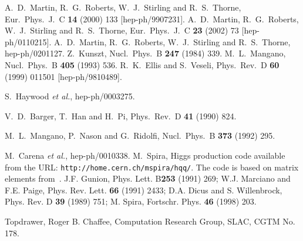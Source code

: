 \documentclass[paper]{JHEP3}
\begin{document}
\begin{thebibliography}{99}
A.~D.~Martin, R.~G.~Roberts, W.~J.~Stirling and R.~S.~Thorne,
Eur.\ Phys.\ J.\ C {\bf 14} (2000) 133
[hep-ph/9907231].
A.~D.~Martin, R.~G.~Roberts, W.~J.~Stirling and R.~S.~Thorne,
Eur.\ Phys.\ J.\ C {\bf 23} (2002) 73
[hep-ph/0110215].
A.~D.~Martin, R.~G.~Roberts, W.~J.~Stirling and R.~S.~Thorne,
hep-ph/0201127.
Z.~Kunszt,
Nucl.\ Phys.\ B {\bf 247} (1984) 339.
M.~L.~Mangano,
Nucl.\ Phys.\ B {\bf 405} (1993) 536.
R.~K.~Ellis and S.~Veseli,
Phys.\ Rev.\ D {\bf 60} (1999) 011501
[hep-ph/9810489].

S.~Haywood {\it et al.},
hep-ph/0003275.

V.~D.~Barger, T.~Han and H.~Pi,
Phys.\ Rev.\ D {\bf 41} (1990) 824.

M.~L.~Mangano, P.~Nason and G.~Ridolfi,
Nucl.\ Phys.\ B {\bf 373} (1992) 295.

M.~Carena {\it et al.},
hep-ph/0010338.
M.~Spira, Higgs production code available from the URL: \newline
{\tt http://home.cern.ch/mspira/hqq/}. The 
code is based on matrix elements from~\cite{Kunszt:1984ri,gunion}.
J.F. Gunion, Phys. Lett. B{\bf 253} (1991) 269;
W.J. Marciano and F.E. Paige, Phys. Rev. Lett. {\bf 66} (1991) 2433;
D.A. Dicus and S. Willenbrock, Phys. Rev. D {\bf39} (1989) 751;
M. Spira, Fortschr. Phys. {\bf 46} (1998) 203.

    Topdrawer, Roger B. Chaffee, Computation Research Group, SLAC, 
   CGTM No.  178. 
\end{thebibliography}
\end{document}
